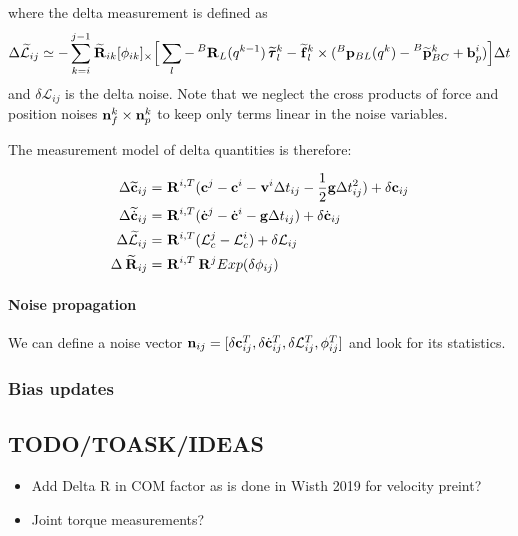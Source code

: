 \documentclass[11pt]{article}
\newcommand{\Rot}[2]{\prescript{#1}{}{\bfR}_{#2}}
\newcommand{\Rotm}[2]{\prescript{#1}{}{\widetilde{\bfR}}_{#2}}
\newcommand{\noise}{\bfn}
\newcommand{\bias}{\bfb}
\newcommand{\posi}[2]{\prescript{#1}{}{\bfp}_{#2}}
\newcommand{\posim}[2]{\prescript{#1}{}{\widetilde{\bfp}}_{#2}}
\newcommand{\vel}[2]{\prescript{#1}{}{\bfv}_{#2}}
\newcommand{\forcem}[2]{\prescript{#1}{}{\widetilde{\bff}}_{#2}}
\newcommand{\torquem}[2]{\prescript{#1}{}{\widetilde{\pmb{\tau}}}_{#2}}
\newcommand{\AM}{\mathcal{L}}
\newcommand{\AMm}{\widetilde{\mathcal{L}}}
\newcommand{\COM}{\bfc}
\newcommand{\COMm}{\widetilde{\bfc}}
\newcommand{\COMd}{\dot{\bfc}}
\newcommand{\COMdm}{\widetilde{\dot{\bfc}}}
\newcommand{\grav}{\bfg}
\begin{document}
where the delta measurement is defined as 
\begin{equation}
    \Delta \AMm_{ij} \simeq -\sum_{k=i}^{j-1} \Rotm{}{ik}[\phi_{ik}]_{\times} \Big[ 
    \sum_l -\Rot{B}{L}(q^{k-1}) \torquem{}{l}^{k} - \forcem{}{l}^{k} \times (\posi{B}{BL}(q^k) - \posim{B}{BC}^k + \bias_{p}^i) \Big]  \Delta t
\end{equation}
and $\delta \AM_{ij}$ is the delta noise. Note that we neglect the cross products of force and position noises $\noise_f^{k} \times \noise_p^k$ to keep only terms linear in the noise variables.

The measurement model of delta quantities is therefore:

\begin{equation}
\begin{split}
\Delta \COMm_{ij}  &= \Rot{}{}^{i,T} (\COM^j - \COM^i - \vel{}{}^i \Delta t_{ij} - \frac{1}{2}\grav \Delta t_{ij}^2) + \delta \COM_{ij} 
\\
\Delta \COMdm_{ij} &= \Rot{}{}^{i,T} (\COMd^{j} - \COMd^{i} - \bfg \Delta t_{ij}) + \delta \COMd_{ij}
\\
\Delta \AMm_{ij}   &= \Rot{}{}^{i,T} (\AM_c^{j} - \AM_c^{i}) + \delta \AM_{ij}
\\
\Delta \Rotm{}{ij} &= \Rot{}{}^{i,T} \Rot{}{}^{j} Exp(\delta \phi_{ij})
\end{split}
\end{equation}


\paragraph{Noise propagation}
We can define a noise vector $\noise_{ij} = [\delta \COM_{ij}^T, \delta \COMd_{ij}^T, \delta \AM_{ij}^T, \phi_{ij}^T]$ and look for its statistics.






\subsubsection{Bias updates}




\subsection{TODO/TOASK/IDEAS}
\begin{itemize}
    \item Add Delta R in COM factor as is done in Wisth 2019 for velocity preint?
    \item Joint torque measurements?
\end{itemize}
\end{document}
